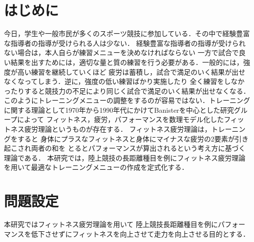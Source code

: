 \documentclass[12pt,fleqn]{jreport}
\begin{document}
\chapter{はじめに}
\large
今日，学生や一般市民が多くのスポーツ競技に参加している．その中で経験豊富な指導者の指導が受けられる人は少ない．
経験豊富な指導者の指導が受けられない場合は，本人自らが練習メニューを決めなければならない
一方で試合で良い結果を出すためには，適切な量と質の練習を行う必要がある．一般的には，強度が高い練習を継続していくほど
疲労は蓄積し，試合で満足のいく結果が出せなくなってしまう．逆に，強度の低い練習ばかり実施したり
全く練習をしなかったりすると競技力の不足により同じく試合で満足のいく結果が出せなくなる．
このようにトレーニングメニューの調整をするのが容易ではない．トレーニングに関する理論として1970年から1990年代にかけてBanisterを中心とした研究グループによって
フィットネス，疲労，パフォーマンスを数理モデル化したフィットネス疲労理論というものが存在する\cite{bani}．
フィットネス疲労理論\cite{bani}は，トレーニングをすると
身体にプラスなフィットネスと身体にマイナスな疲労の2要素が引き起こされ両者の和を
とるとパフォーマンスが算出されるという考え方に基づく理論である．
本研究では，陸上競技の長距離種目を例にフィットネス疲労理論\cite{bani}を用いて最適なトレーニングメニューの作成を定式化する．
\newpage
\chapter{問題設定}
本研究ではフィットネス疲労理論\cite{bani}を用いて
陸上競技長距離種目を例にパフォーマンスを低下させずにフィットネスを向上させて走力を向上させる目的とする．
\vspace{1cm}
\end{document}
